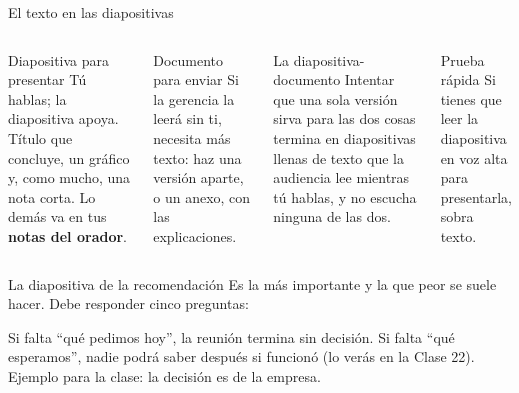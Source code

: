\documentclass[aspectratio=169,11pt]{beamer}
\begin{document}
\begin{frame}[t]{El texto en las diapositivas}
  \begin{columns}[T,onlytextwidth]
    \begin{block}{Diapositiva para presentar}
      \footnotesize Tú hablas; la diapositiva apoya. Título que concluye,
      un gráfico y, como mucho, una nota corta. Lo demás va en tus
      \textbf{notas del orador}.
    \end{block}
    \begin{block}{Documento para enviar}
      \footnotesize Si la gerencia la leerá sin ti, necesita más texto:
      haz una versión aparte, o un anexo, con las explicaciones.
    \end{block}
    \begin{alertblock}{La diapositiva-documento}
      \footnotesize Intentar que una sola versión sirva para las dos cosas
      termina en diapositivas llenas de texto que la audiencia lee mientras
      tú hablas, y no escucha ninguna de las dos.
    \end{alertblock}
    \begin{exampleblock}{Prueba rápida}
      \footnotesize Si tienes que leer la diapositiva en voz alta para
      presentarla, sobra texto.
    \end{exampleblock}
  \end{columns}
\end{frame}

\begin{frame}[t]{La diapositiva de la recomendación}
  \small Es la más importante y la que peor se suele hacer. Debe responder
  cinco preguntas:
  \vspace{0.1cm}
  \begin{center}
  \end{center}
  \footnotesize Si falta ``qué pedimos hoy'', la reunión termina sin
  decisión. Si falta ``qué esperamos'', nadie podrá saber después si
  funcionó (lo verás en la Clase 22). Ejemplo para la clase: la decisión es
  de la empresa.
\end{frame}
\end{document}

